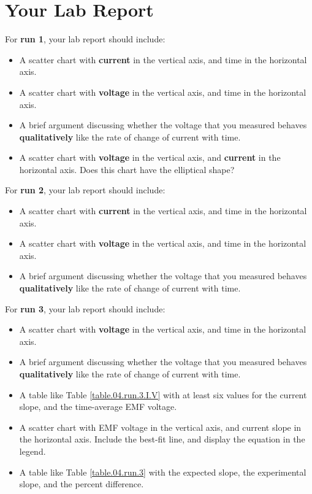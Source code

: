 \section{Your Lab Report}
%
For \textbf{run 1}, your lab report should include:
\begin{itemize}
	\item A scatter chart with \textbf{current} in the vertical axis, and time in the horizontal axis.
	\item A scatter chart with \textbf{voltage} in the vertical axis, and time in the horizontal axis.
	\item A brief argument discussing whether the voltage that you measured behaves \textbf{qualitatively} like the rate of change of current with time.
	\item A scatter chart with \textbf{voltage} in the vertical axis, and \textbf{current} in the horizontal axis. Does this chart have the elliptical shape?
\end{itemize}
For \textbf{run 2}, your lab report should include:
\begin{itemize}
	\item A scatter chart with \textbf{current} in the vertical axis, and time in the horizontal axis.
	\item A scatter chart with \textbf{voltage} in the vertical axis, and time in the horizontal axis.
	\item A brief argument discussing whether the voltage that you measured behaves \textbf{qualitatively} like the rate of change of current with time.
\end{itemize}
For \textbf{run 3}, your lab report should include:
\begin{itemize}
	\item A scatter chart with \textbf{voltage} in the vertical axis, and time in the horizontal axis.
	\item A brief argument discussing whether the voltage that you measured behaves \textbf{qualitatively} like the rate of change of current with time.
	\item A table like Table \ref{table.04.run.3.I.V} with at least six values for the current slope, and the time-average EMF voltage.
	\item A scatter chart with EMF voltage in the vertical axis, and current slope in the horizontal axis. Include the best-fit line, and display the equation in the legend.
	\item A table like Table \ref{table.04.run.3} with the expected slope, the experimental slope, and the percent difference.
\end{itemize}

